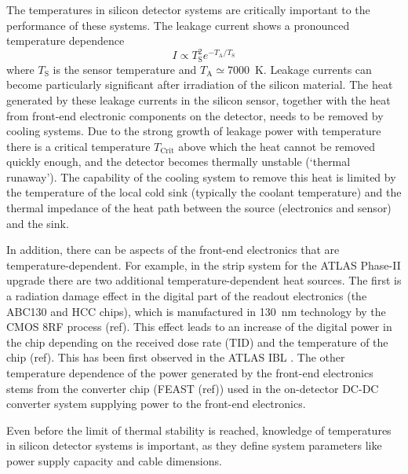 The temperatures in silicon detector systems are critically important to the performance of these systems. The leakage current shows a pronounced temperature dependence 
\begin{equation}
I\propto T_\text{S}^2e^{-T_\text{A}/T_\text{S}}
\label{eq:leakage_current_temp_dependence}
\end{equation}
where $T_\text{S}$ is the sensor temperature and $T_\text{A}\simeq7000$~K. Leakage currents can become particularly significant after irradiation of the silicon material. The heat generated by these leakage currents in the silicon sensor, together with the heat from front-end electronic components on the detector, needs to be removed by cooling systems. Due to the strong growth of leakage power with temperature there is a critical temperature $T_\text{Crit}$ above which the heat cannot be removed quickly enough, and the detector becomes thermally unstable (`thermal runaway'). The capability of the cooling system to remove this heat is limited by the temperature of the local cold sink (typically the coolant temperature) and the thermal impedance of the heat path between the source (electronics and sensor) and the sink.

In addition, there can be aspects of the front-end electronics that are temperature-dependent. For example, in the strip system for the ATLAS Phase-II upgrade \cite{Collaboration:2017mtb} there are two additional temperature-dependent heat sources. The first is a radiation damage effect in the digital part of the readout electronics (the ABC130 and HCC chips), which is manufactured in 130~nm technology by the CMOS 8RF process (ref). This effect leads to an increase of the digital power in the chip depending on the received dose rate (TID) and the temperature of the chip (ref). This has been first observed in the ATLAS IBL \cite{ATL-INDET-PUB-2017-001}. The other temperature dependence of the power generated by the front-end electronics stems from the converter chip (FEAST (ref)) used in the on-detector DC-DC converter system supplying power to the front-end electronics. 

Even before the limit of thermal stability is reached, knowledge of temperatures in silicon detector systems is important, as they define system parameters like power supply capacity and cable dimensions.

